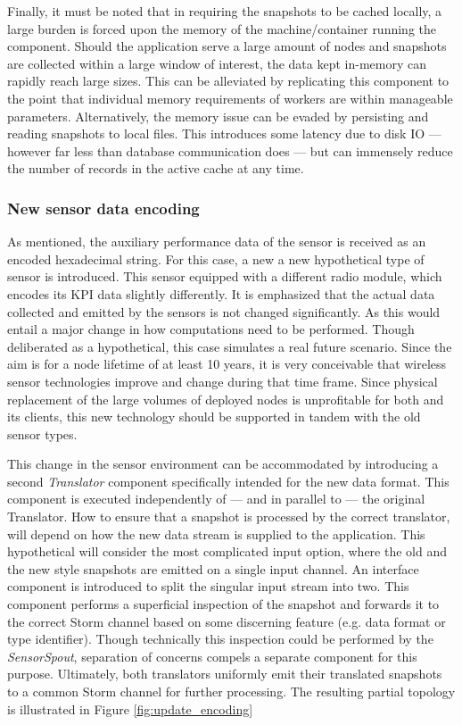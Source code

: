 Finally, it must be noted that in requiring the snapshots to be cached locally, a large burden is forced upon the memory of the machine/container running the component. Should the application serve a large amount of nodes and snapshots are collected within a large window of interest, the data kept in-memory can rapidly reach large sizes. This can be alleviated by replicating this component to the point that individual memory requirements of workers are within manageable parameters. Alternatively, the memory issue can be evaded by persisting and reading snapshots to local files. This introduces some latency due to disk IO --- however far less than database communication does --- but can immensely reduce the number of records in the active cache at any time.

\subsubsection{New sensor data encoding}
As mentioned, the auxiliary performance data of the sensor is received as an encoded hexadecimal string. For this case, a new a new hypothetical type of sensor is introduced. This sensor equipped with a different radio module, which encodes its KPI data slightly differently. It is emphasized that the actual data collected and emitted by the sensors is not changed significantly. As this would entail a major change in how computations need to be performed. Though deliberated as a hypothetical, this case simulates a real future scenario. Since the aim is for a node lifetime of at least 10 years, it is very conceivable that wireless sensor technologies improve and change during that time frame. Since physical replacement of the large volumes of deployed nodes is unprofitable for both \nedap and its clients, this new technology should be supported in tandem with the old sensor types.

This change in the sensor environment can be accommodated by introducing a second \emph{Translator} component specifically intended for the new data format. This component is executed independently of --- and in parallel to --- the original Translator. How to ensure that a snapshot is processed by the correct translator, will depend on how the new data stream is supplied to the application. This hypothetical will consider the most complicated input option, where the old and the new style snapshots are emitted on a single input channel. An interface component is introduced to split the singular input stream into two. This component performs a superficial inspection of the snapshot and forwards it to the correct Storm channel based on some discerning feature (e.g. data format or type identifier). Though technically this inspection could be performed by the \emph{SensorSpout}, separation of concerns compels a separate component for this purpose. Ultimately, both translators uniformly emit their translated snapshots to a common Storm channel for further processing. The resulting partial topology is illustrated in Figure \ref{fig:update_encoding}

